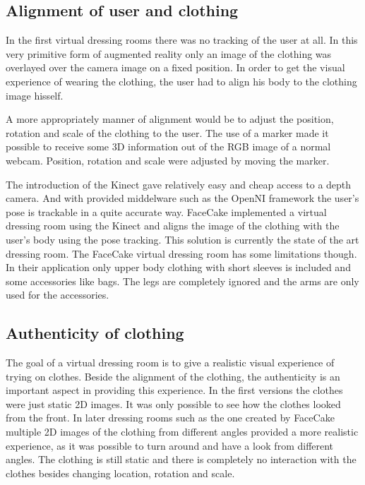 \documentclass[a4paper]{article}
\begin{document}
\subsection{Alignment of user and clothing}

In the first virtual dressing rooms there was no tracking of the user at all. In this very primitive form of augmented reality only an image of the clothing was overlayed over the camera image on a fixed position. In order to get the visual experience of wearing the clothing, the user had to align his body to the clothing image hisself. 


A more appropriately manner of alignment would be to adjust the position, rotation and scale of the clothing to the user. The use of a marker made it possible to receive some 3D information out of the RGB image of a normal webcam. Position, rotation and scale were adjusted by moving the marker.


The introduction of the Kinect gave relatively easy and cheap access to a depth camera. And with provided middelware such as the OpenNI framework the user's pose is trackable in a quite accurate way. FaceCake implemented a virtual dressing room using the Kinect and aligns the image of the clothing with the user's body using the pose tracking. This solution is currently the state of the art dressing room.
The FaceCake virtual dressing room has some limitations though. In their application only upper body clothing with short sleeves is included and some accessories like bags. The legs are completely ignored and the arms are only used for the accessories.


\subsection{Authenticity of clothing}

The goal of a virtual dressing room is to give a realistic visual experience of trying on clothes. Beside the alignment of the clothing, the authenticity is an important aspect in providing this experience. In the first versions the clothes were just static 2D images. It was only possible to see how the clothes looked from the front. In later dressing rooms such as the one created by FaceCake multiple 2D images of the clothing from different angles provided a more realistic experience, as it was possible to turn around and have a look from different angles. The clothing is still static and there is completely no interaction with the clothes besides changing location, rotation and scale.
\end{document}
